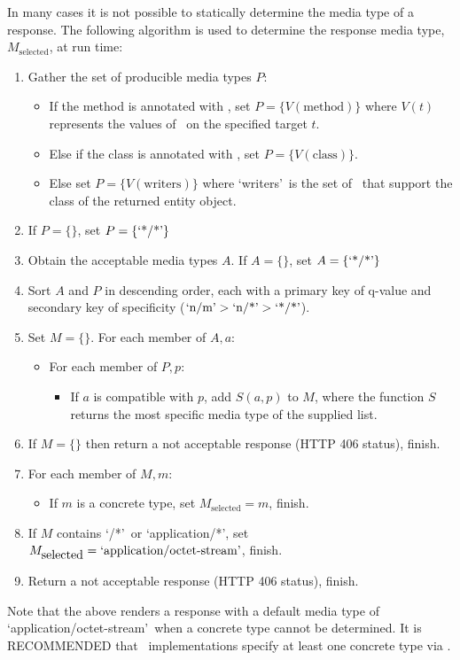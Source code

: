 In many cases it is not possible to statically determine the media type of a response. The following algorithm is used to determine the response media type, $M_{\mbox{selected}}$, at run time:

\begin{enumerate}
\item Gather the set of producible media types $P$:
\begin{itemize}
\item If the method is annotated with \ProduceMime, set $P = \{ V(\mbox{method}) \}$ where $V(t)$ represents the values of \ProduceMime\ on the specified target $t$.
\item Else if the class is annotated with \ProduceMime, set $P = \{ V(\mbox{class}) \}$.
\item Else set $P = \{ V(\mbox{writers}) \}$ where \lq writers\rq\ is the set of \MsgWrite\ that support the class of the returned entity object.
\end{itemize}

\item If $P = \{\}$, set $P = \{\mbox{\lq*/*\rq}\}$

\item Obtain the acceptable media types $A$. If $A = \{\}$, set $A = \{\mbox{\lq*/*\rq}\}$

\item Sort $A$ and $P$ in descending order, each with a primary key of q-value and secondary key of specificity ($\mbox{\lq n/m\rq} > \mbox{\lq n/*\rq} > \mbox{\lq*/*\rq}$).

\item Set $M=\{\}$. For each member of $A, a$:
\begin{itemize}
\item For each member of $P, p$:
\begin{itemize}
\item If $a$ is compatible with $p$, add $S(a,p)$ to $M$, where the function $S$ returns the most specific media type of the supplied list.
\end{itemize}
\end{itemize}

\item If $M = \{\}$ then return a not acceptable response (HTTP 406 status), finish.

\item For each member of $M, m$:
\begin{itemize}
\item If $m$ is a concrete type, set $M_{\mbox{selected}} = m$, finish.
\end{itemize}

\item If $M$ contains \lq*/*\rq\ or \lq application/*\rq, set $M_{\mbox{selected}} = \mbox{\lq application/octet-stream\rq}$, finish.

\item Return a not acceptable response (HTTP 406 status), finish.
\end{enumerate}

Note that the above renders a response with a default media type of \lq application/octet-stream\rq\ when a concrete type cannot be determined. It is RECOMMENDED that \MsgWrite\ implementations specify at least one concrete type via \ProduceMime.